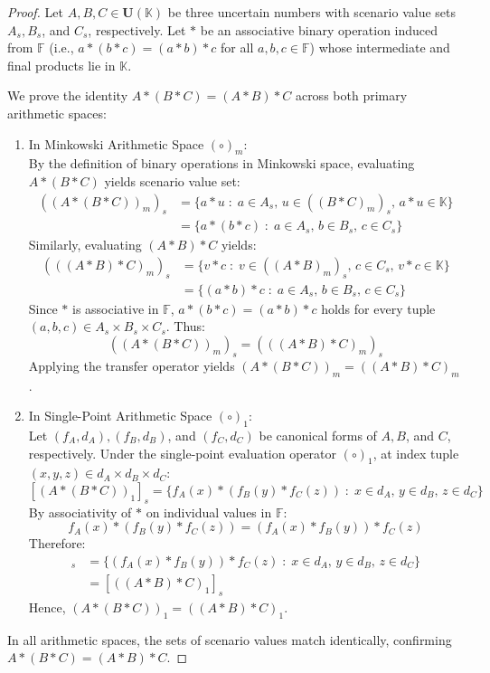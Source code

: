 \documentclass[a4paper,12pt,twoside]{memoir}
\newcommand{\tsbd}[1]{\mathbf{U}(\mathbb{#1})}
\newcommand{\kgdd}[1]{\left(#1\right)_1} %
\begin{document}
	\begin{proof}
		Let $A, B, C \in \tsbd{K}$ be three uncertain numbers with scenario value sets $A_s, B_s$, and $C_s$, respectively. Let $*$ be an associative binary operation induced from $\mathbb{F}$ (i.e., $a * (b * c) = (a * b) * c$ for all $a, b, c \in \mathbb{F}$) whose intermediate and final products lie in $\mathbb{K}$.
		
		We prove the identity $A * (B * C) = (A * B) * C$ across both primary arithmetic spaces:
		
		\begin{enumerate}[leftmargin=*]
			\item In Minkowski Arithmetic Space $(\circ)_m$: \\
			By the definition of binary operations in Minkowski space, evaluating $A * (B * C)$ yields scenario value set:
			\begin{align*}
				((A * (B * C))_m)_s & = \{a * u \;:\; a \in A_s, \, u \in ((B * C)_m)_s, \, a * u \in \mathbb{K}\}            \\
				& = \{a * (b * c) \;:\; a \in A_s, \, b \in B_s, \, c \in C_s\}
			\end{align*}
			Similarly, evaluating $(A * B) * C$ yields:
			\begin{align*}
				(( (A * B) * C)_m)_s & = \{v * c \;:\; v \in ((A * B)_m)_s, \, c \in C_s, \, v * c \in \mathbb{K}\}            \\
				& = \{(a * b) * c \;:\; a \in A_s, \, b \in B_s, \, c \in C_s\}
			\end{align*}
			Since $*$ is associative in $\mathbb{F}$, $a * (b * c) = (a * b) * c$ holds for every tuple $(a, b, c) \in A_s \times B_s \times C_s$. Thus:
			\[
			((A * (B * C))_m)_s = (( (A * B) * C)_m)_s
			\]
			Applying the transfer operator yields $(A * (B * C))_m = ((A * B) * C)_m$.
			
			\item In Single-Point Arithmetic Space $(\circ)_1$: \\
			Let $(f_A, d_A), (f_B, d_B)$, and $(f_C, d_C)$ be canonical forms of $A, B$, and $C$, respectively. Under the single-point evaluation operator $\kgdd{\circ}$, at index tuple $(x, y, z) \in d_A \times d_B \times d_C$:
			\[
			[\kgdd{A * (B * C)}]_s = \{f_A(x) * (f_B(y) * f_C(z)) \;:\; x \in d_A, \, y \in d_B, \, z \in d_C\}
			\]
			By associativity of $*$ on individual values in $\mathbb{F}$:
			\[
			f_A(x) * (f_B(y) * f_C(z)) = (f_A(x) * f_B(y)) * f_C(z)
			\]
			Therefore:
			\begin{align*}
				[\kgdd{A * (B * C)}]_s &= \{(f_A(x) * f_B(y)) * f_C(z) \;:\; x \in d_A, \, y \in d_B, \, z \in d_C\} \\
				&= [\kgdd{(A * B) * C}]_s
			\end{align*}
			Hence, $\kgdd{A * (B * C)} = \kgdd{(A * B) * C}$.
		\end{enumerate}
		
		In all arithmetic spaces, the sets of scenario values match identically, confirming $A * (B * C) = (A * B) * C$.
	\end{proof}
\end{document}
